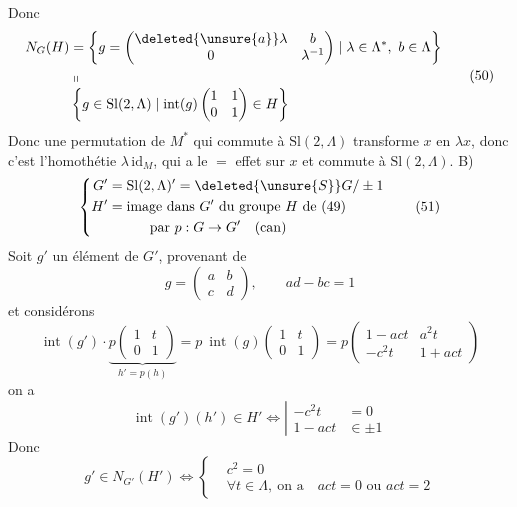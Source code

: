 Donc
\[
\begin{aligned}
N_G(H)&=\left\{g=\begin{pmatrix}\deleted{\unsure{a}}\lambda&b\\0&\lambda^{-1}\end{pmatrix}\mid\lambda\in\Lambda^*,\ b\in\Lambda\right\}\\
&\shortparallel\\[-3pt]
&\left\{g\in\mathrm{Sl}(2,\Lambda)\mid\operatorname{int}(g)\begin{pmatrix}1&1\\0&1\end{pmatrix}\in H\right\}
\end{aligned}\tag*{(50)}
\]
Donc une  permutation de $M^*$ qui
commute à $\mathrm{Sl}(2,\Lambda)$ transforme $x$ en $\lambda x$, \inserted{$(\lambda\in\Lambda^*)$}
donc c'est l'homothétie $\lambda\,\mathrm{id}_M$, qui a le
$=$ effet sur $x$ et commute à $\mathrm{Sl}(2,\Lambda)$.
B)
\[
\left\{\begin{aligned}
G'&=\mathrm{Sl}(2,\Lambda)'=\deleted{\unsure{S}}G/\pm1\\
H'&=\text{image dans }G'\text{ du groupe }H\text{ de (49)}\\
&\hspace{3em}\text{par }p:G\to G'\quad\text{(can)}
\end{aligned}\right.\tag*{(51)}
\]
Soit $g'$ un élément de $G'$, provenant de
\[
g=\begin{pmatrix}a&b\\c&d\end{pmatrix},\qquad ad-bc=1
\]
et considérons  
\[
\operatorname{int}(g')\cdot\underbrace{p\begin{pmatrix}1&t\\0&1\end{pmatrix}}_{h'=p(h)}
=p\ \operatorname{int}(g)\begin{pmatrix}1&t\\0&1\end{pmatrix}
=p\begin{pmatrix}1-act&a^2t\\-c^2t&1+act\end{pmatrix}
\]
on a
\[
\operatorname{int}(g')(h')\in H'\Longleftrightarrow
\left|\begin{aligned}-c^2t&=0\\1-act&\in\pm1\end{aligned}\right.\tag*{(52)}
\]
Donc
\[
g'\in N_{G'}(H')\Longleftrightarrow
\left\{\begin{aligned}&c^2=0\\&\forall t\in\Lambda,\ \text{on a}\quad act=0\text{ ou }act=2\end{aligned}\right.
\]

